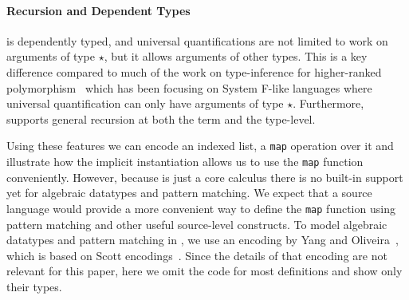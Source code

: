\paragraph{Recursion and Dependent Types}

\name is dependently typed, and universal quantifications are not limited to work
on arguments of type $\star$, but it allows arguments of other types. This is
a key difference compared to much of the work on type-inference for higher-ranked
polymorphism~\cite{dunfield2013complete,le2003ml,leijen2008hmf,vytiniotis2008fph,jones2007practical}
which has been focusing on System F-like
languages where universal quantification can only have arguments of type $\star$.
Furthermore, \name supports general recursion at both the term and the type-level.

Using these features we can encode an indexed list, a \verb|map| operation over it
and illustrate how the implicit instantiation allows us to use the \verb|map|
function conveniently.
However, because \name is just a core calculus there is no built-in support
yet for algebraic datatypes and pattern matching.
We expect that a source language would provide a more convenient
way to define the \verb|map| function using pattern matching and other useful source-level
constructs. To model algebraic datatypes and pattern matching in \name, we
use an encoding by Yang and Oliveira~\cite{yang2019pure},
which is based on Scott encodings~\cite{mogensen1992efficient}.
Since the details of that encoding are not relevant for this paper,
here we omit the code for most definitions and show only their types.

